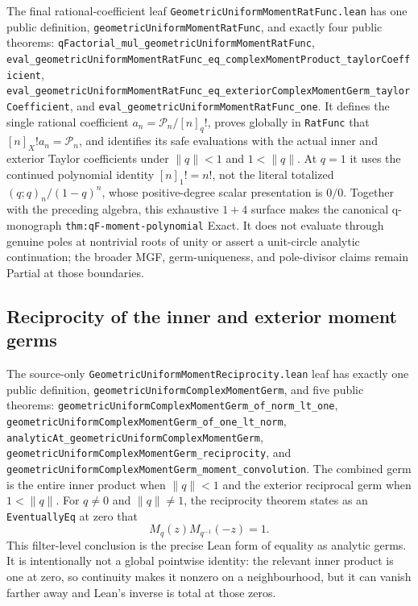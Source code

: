 \documentclass[11pt,oneside]{article}
\theoremstyle{definition}
\theoremstyle{remark}
\begin{document}
The final rational-coefficient leaf
\nolinkurl{GeometricUniformMomentRatFunc.lean} has one public definition,
\nolinkurl{geometricUniformMomentRatFunc}, and exactly four public theorems:
\nolinkurl{qFactorial_mul_geometricUniformMomentRatFunc},
\nolinkurl{eval_geometricUniformMomentRatFunc_eq_complexMomentProduct_taylorCoefficient},
\nolinkurl{eval_geometricUniformMomentRatFunc_eq_exteriorComplexMomentGerm_taylorCoefficient},
and \nolinkurl{eval_geometricUniformMomentRatFunc_one}.  It defines the single
rational coefficient \(a_n=\mathcal P_n/[n]_q!\), proves globally in
\nolinkurl{RatFunc} that \([n]_X!a_n=\mathcal P_n\), and identifies its safe
evaluations with the actual inner and exterior Taylor coefficients under
\(\lVert q\rVert<1\) and \(1<\lVert q\rVert\).  At \(q=1\) it uses the
continued polynomial identity \([n]_1!=n!\), not the literal totalized
\((q;q)_n/(1-q)^n\), whose positive-degree scalar presentation is \(0/0\).
Together with the preceding algebra, this exhaustive \(1+4\) surface makes
the canonical q-monograph \nolinkurl{thm:qF-moment-polynomial} Exact.  It does
not evaluate through genuine poles at nontrivial roots of unity or assert a
unit-circle analytic continuation; the broader MGF, germ-uniqueness, and
pole-divisor claims remain Partial at those boundaries.

\subsection{Reciprocity of the inner and exterior moment germs}
The source-only \nolinkurl{GeometricUniformMomentReciprocity.lean} leaf has
exactly one public definition,
\nolinkurl{geometricUniformComplexMomentGerm}, and five public theorems:
\nolinkurl{geometricUniformComplexMomentGerm_of_norm_lt_one},
\nolinkurl{geometricUniformComplexMomentGerm_of_one_lt_norm},
\nolinkurl{analyticAt_geometricUniformComplexMomentGerm},
\nolinkurl{geometricUniformComplexMomentGerm_reciprocity}, and
\nolinkurl{geometricUniformComplexMomentGerm_moment_convolution}.
The combined germ is the entire inner product when \(\lVert q\rVert<1\) and
the exterior reciprocal germ when \(1<\lVert q\rVert\).  For
\(q\ne0\) and \(\lVert q\rVert\ne1\), the reciprocity theorem states as an
\nolinkurl{EventuallyEq} at zero that
\[
 M_q(z)M_{q^{-1}}(-z)=1.
\]
This filter-level conclusion is the precise Lean form of equality as analytic
germs.  It is intentionally not a global pointwise identity: the relevant
inner product is one at zero, so continuity makes it nonzero on a neighbourhood,
but it can vanish farther away and Lean's inverse is total at those zeros.
\end{document}
